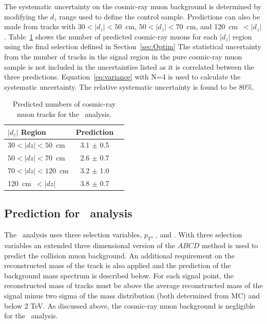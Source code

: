 The systematic uncertainty on the cosmic-ray muon background is determined by
modifying the $d_z$ range used to define the control sample.  Predictions
can also be made from tracks with $30 < |d_z| < 50$~cm, $50 < |d_z| < 70$~cm, and
120~cm~$< |d_z|$.  Table~\ref{tab:CosmicPred} shows the number of predicted cosmic-ray muons
for each $|d_z|$ region using the final selection defined in Section~\ref{sec:Optim}
The statistical uncertainty from the number of tracks in the signal region in the
pure cosmic-ray muon sample is not included in the uncertainties listed as it is correlated
between the three predictions.
Equation~\ref{eq:variance} with N=4 is used to calculate the systematic uncertainty.
The relative systematic uncertainty is found to be 80\%.

\begin{table}
 \begin{center}
  \caption{Predicted numbers of cosmic-ray muon tracks for the \muononly\ analysis.}
     \label{tab:CosmicPred}
  \begin{tabular}{|l|c|c|} \hline
   $|d_z|$ Region            & Prediction  \\ \hline
   $30 < |dz| < 50$~cm  & 3.1 $\pm$ 0.5   \\ \hline
   $50 < |dz| < 70$~cm  & 2.6 $\pm$ 0.7   \\ \hline
   $70 < |dz| < 120$~cm & 3.2 $\pm$ 1.0   \\ \hline
   120~cm~$< |dz|$      & 3.8 $\pm$ 0.7   \\ \hline
  \end{tabular}
 \end{center}
\end{table}

\subsection{Prediction for \tktof\ analysis}

The \tktof\ analysis uses three selection variables, $p_T$, \invbeta, and \ias. With three selection variables an extended three dimensional version of the 
$ABCD$ method is used to predict the collision muon background. An additional requirement on the reconstructed mass of the track
is also applied and the prediction of the background mass spectrum is described below. 
For each signal point, the reconstructed mass of tracks must be above the average reconstructed mass of the signal minus two sigma of the mass
distribution (both determined from MC) and below 2 TeV.
As discussed above, the cosmic-ray muon background is negligible
for the \tktof\ analysis. 

